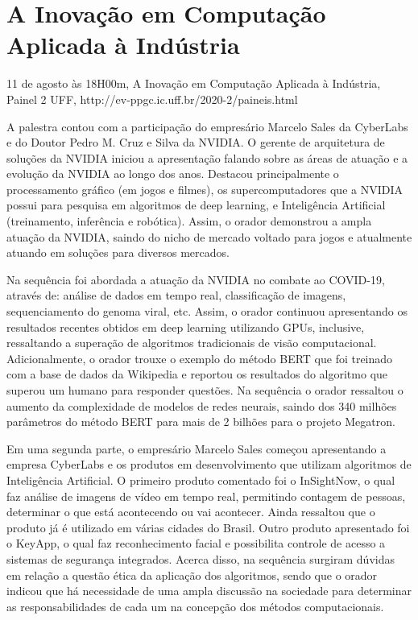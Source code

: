 \section{A Inovação em Computação Aplicada à Indústria}

\begin{center}
  \vspace{1cm}
  11 de agosto às 18H00m, A Inovação em Computação Aplicada à Indústria, Painel 2 UFF, http://ev-ppgc.ic.uff.br/2020-2/paineis.html
  \vspace{1cm}
\end{center}

A palestra contou com a participação do empresário Marcelo Sales da CyberLabs e do Doutor Pedro M. Cruz e Silva da NVIDIA. O gerente de arquitetura de soluções da NVIDIA iniciou a apresentação falando sobre as áreas de atuação e a evolução da NVIDIA ao longo dos anos. Destacou principalmente o processamento gráfico (em jogos e filmes), os supercomputadores que a NVIDIA possui para pesquisa em algoritmos de deep learning, e Inteligência Artificial (treinamento, inferência e robótica). Assim, o orador demonstrou a ampla atuação da NVIDIA, saindo do nicho de mercado voltado para jogos e atualmente atuando em soluções para diversos mercados.

Na sequência foi abordada a atuação da NVIDIA no combate ao COVID-19, através de: análise de dados em tempo real, classificação de imagens, sequenciamento do genoma viral, etc. Assim, o orador continuou apresentando os resultados recentes obtidos em deep learning utilizando GPUs, inclusive, ressaltando a superação de algoritmos tradicionais de visão computacional. Adicionalmente, o orador trouxe o exemplo do método BERT que foi treinado com a base de dados da Wikipedia e reportou os resultados do algoritmo que superou um humano para responder questões. Na sequência o orador ressaltou o aumento da complexidade de modelos de redes neurais, saindo dos 340 milhões parâmetros do método BERT para mais de 2 bilhões para o projeto Megatron.

Em uma segunda parte, o empresário Marcelo Sales começou apresentando a empresa CyberLabs e os produtos em desenvolvimento que utilizam algoritmos de Inteligência Artificial. O primeiro produto comentado foi o InSightNow, o qual faz análise de imagens de vídeo em tempo real, permitindo contagem de pessoas, determinar o que está acontecendo ou vai acontecer. Ainda ressaltou que o produto já é utilizado em várias cidades do Brasil.
Outro produto apresentado foi o KeyApp, o qual faz reconhecimento facial e possibilita controle de acesso a sistemas de segurança integrados. Acerca disso, na sequência surgiram dúvidas em relação a questão ética da aplicação dos algoritmos, sendo que o orador indicou que há necessidade de uma ampla discussão na sociedade para determinar as responsabilidades de cada um na concepção dos métodos computacionais.

